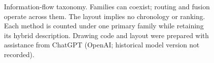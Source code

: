 \documentclass[5p,times,authoryear]{elsarticle}
\begin{document}
\begin{figure}[t]
\endgroup
\caption{Information-flow taxonomy. Families can coexist; routing and fusion
operate across them. The layout implies no chronology or ranking. Each method
is counted under one primary family while retaining its hybrid description. Drawing code and layout were prepared with assistance from ChatGPT (OpenAI; historical model version not recorded).}
\label{fig:taxonomy}
\end{figure}
\end{document}
